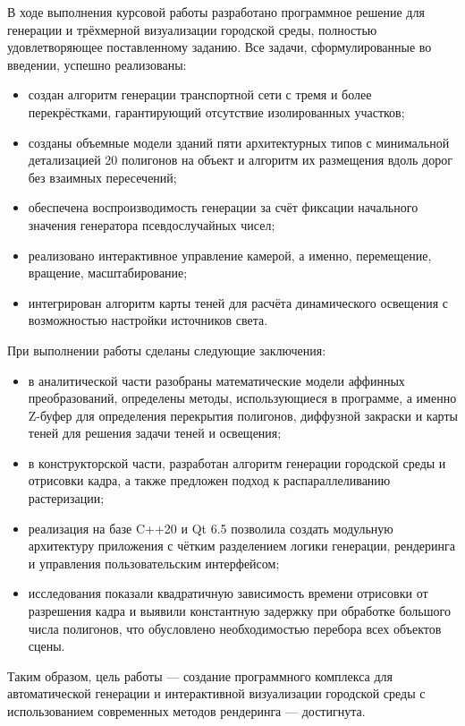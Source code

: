 
В ходе выполнения курсовой работы разработано программное решение для генерации и трёхмерной визуализации городской среды, полностью удовлетворяющее поставленному заданию. Все задачи, сформулированные во введении, успешно реализованы:  
\begin{itemize}  
    \item создан алгоритм генерации транспортной сети с тремя и более перекрёстками, гарантирующий отсутствие изолированных участков;
    \item созданы объемные модели зданий пяти архитектурных типов с минимальной детализацией 20 полигонов на объект и алгоритм их размещения вдоль дорог без взаимных пересечений;
    \item обеспечена воспроизводимость генерации за счёт фиксации начального значения генератора псевдослучайных чисел;
    \item реализовано интерактивное управление камерой, а именно, перемещение, вращение, масштабирование;
    \item интегрирован алгоритм карты теней для расчёта динамического освещения с возможностью настройки источников света.
\end{itemize}  



При выполнении работы сделаны следующие заключения:  
\begin{itemize}  
    \item в аналитической части разобраны математические модели аффинных преобразований, определены методы, использующиеся в программе, а именно Z-буфер для определения перекрытия полигонов, диффузной закраски и карты теней для решения задачи теней и освещения;
    \item в конструкторской части, разработан алгоритм генерации городской среды и отрисовки кадра, а также предложен подход к распараллеливанию растеризации;
    \item реализация на базе C++20 и Qt 6.5 позволила создать модульную архитектуру приложения с чётким разделением логики генерации, рендеринга и управления пользовательским интерфейсом;
    \item исследования показали квадратичную зависимость времени отрисовки от разрешения кадра и выявили константную задержку при обработке большого числа полигонов, что обусловлено необходимостью перебора всех объектов сцены.
\end{itemize}

Таким образом, цель работы --- создание программного комплекса для автоматической генерации и интерактивной визуализации городской среды с использованием современных методов рендеринга --- достигнута. 

\clearpage